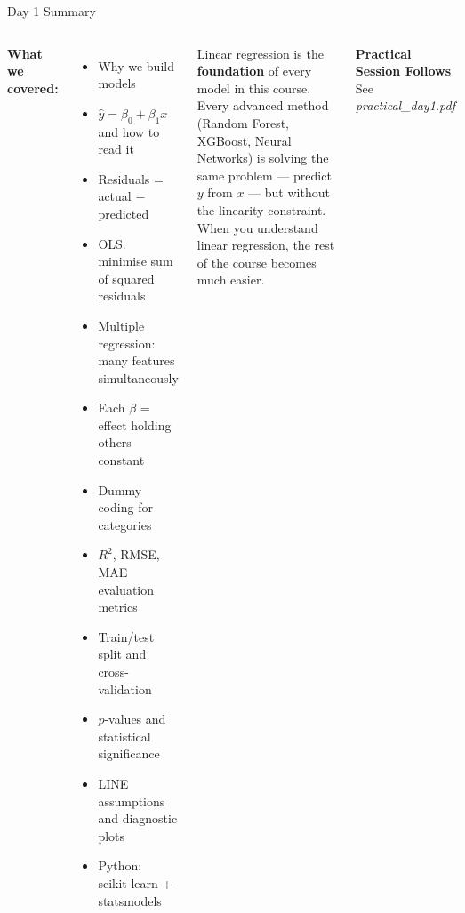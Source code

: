 \documentclass[aspectratio=169,10pt]{beamer}
\begin{document}
\begin{frame}{Day 1 Summary}
  \begin{columns}
      \textbf{\textcolor{TealM}{What we covered:}}
      \begin{itemize}
        \setlength\itemsep{0.2cm}
        \item Why we build models
        \item $\hat{y} = \beta_0 + \beta_1 x$ and how to read it
        \item Residuals = actual $-$ predicted
        \item OLS: minimise sum of squared residuals
        \item Multiple regression: many features simultaneously
        \item Each $\beta$ = effect holding others constant
        \item Dummy coding for categories
        \item $R^2$, RMSE, MAE evaluation metrics
        \item Train/test split and cross-validation
        \item $p$-values and statistical significance
        \item LINE assumptions and diagnostic plots
        \item Python: scikit-learn + statsmodels
      \end{itemize}
      \begin{tcolorbox}[keybox,title={\bfseries\textbf{*} The Big Idea}]
        \small Linear regression is the \textbf{foundation} of every model
        in this course.\\[6pt]
        Every advanced method (Random Forest, XGBoost, Neural Networks)
        is solving the same problem --- predict $y$ from $x$ --- but
        without the linearity constraint.\\[6pt]
        When you understand linear regression, the rest of the course
        becomes much easier.
      \end{tcolorbox}
      \vspace{0.3cm}
      \begin{center}
        \large\textbf{Practical Session Follows}\\[4pt]
        \small See \textit{practical\_day1.pdf}
      \end{center}
  \end{columns}
\end{frame}
\end{document}
